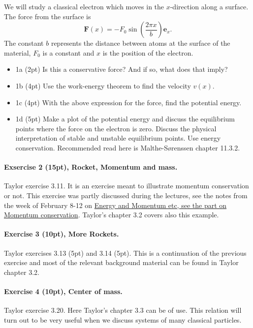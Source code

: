 \documentclass[%
oneside,                 %
final,                   %
10pt]{article}
\begin{document}
We will study a classical electron which moves in the $x$-direction along a surface. The force from the surface is
\[
\bm{F}(x)=-F_0\sin{(\frac{2\pi x}{b})}\bm{e}_x.
\]
The constant $b$ represents the distance between atoms at the surface of the material, $F_0$ is a constant and $x$ is the position of the electron.

\begin{itemize}
\item 1a (2pt) Is this a conservative force? And if so, what does that imply?

\item 1b (4pt) Use the work-energy theorem to find the velocity $v(x)$. 

\item 1c (4pt) With the above expression for the force, find the potential energy.

\item 1d (5pt) Make a plot of the potential energy and discuss the equilibrium points where the force on the electron is zero. Discuss the physical interpretation of stable and unstable equilibrium points. Use energy conservation. Recommended read here  is Malthe-Sørenssen chapter 11.3.2.
\end{itemize}

\noindent
\paragraph{Exsercise 2 (15pt), Rocket, Momentum and mass.}
Taylor exercise 3.11.   It is an exercise meant to illustrate momentum conservation or not. 
This exercise was partly discussed during the lectures, see the notes from the week of February 8-12 on \href{{https://mhjensen.github.io/Physics321/doc/pub/week6/html/week6.html}}{Energy and Momentum etc, see the part on Momentum conservation}. Taylor's chapter 3.2 covers also this example.


\paragraph{Exercise 3 (10pt), More Rockets.}
Taylor exercises 3.13 (5pt) and 3.14 (5pt). This is a continuation of
the previous exercise and most of the relevant background material can
be found in Taylor chapter 3.2.

\paragraph{Exercise 4 (10pt), Center of mass.}
Taylor exercise 3.20. Here Taylor's chapter 3.3 can be of use. This
relation will turn out to be very useful when we discuss systems of
many classical particles.
\end{document}
